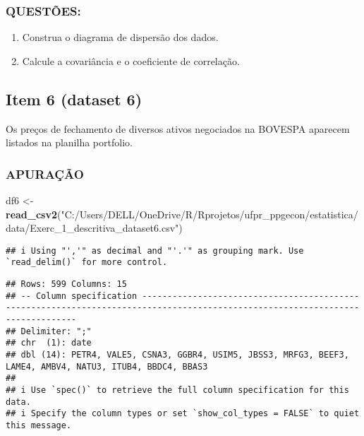 \documentclass[
]{article}
\newenvironment{Shaded}{\begin{snugshade}}{\end{snugshade}}
\newcommand{\FunctionTok}[1]{\textcolor[rgb]{0.13,0.29,0.53}{\textbf{#1}}}
\newcommand{\NormalTok}[1]{#1}
\newcommand{\OtherTok}[1]{\textcolor[rgb]{0.56,0.35,0.01}{#1}}
\newcommand{\StringTok}[1]{\textcolor[rgb]{0.31,0.60,0.02}{#1}}
\providecommand{\tightlist}{%
  \setlength{\itemsep}{0pt}\setlength{\parskip}{0pt}}
\begin{document}
\hypertarget{questuxf5es-4}{%
\subsubsection{QUESTÕES:}\label{questuxf5es-4}}

\begin{enumerate}
\def\labelenumi{\alph{enumi})}
\tightlist
\item
  Construa o diagrama de dispersão dos dados.\\
\item
  Calcule a covariância e o coeficiente de correlação.
\end{enumerate}

\hypertarget{item-6-dataset-6}{%
\subsection{Item 6 (dataset 6)}\label{item-6-dataset-6}}

Os preços de fechamento de diversos ativos negociados na BOVESPA
aparecem listados na planilha portfolio.

\hypertarget{apurauxe7uxe3o-5}{%
\subsubsection{APURAÇÃO}\label{apurauxe7uxe3o-5}}

\begin{Shaded}
\begin{Highlighting}[]
\NormalTok{df6 }\OtherTok{\textless{}{-}} \FunctionTok{read\_csv2}\NormalTok{(}\StringTok{"C:/Users/DELL/OneDrive/R/Rprojetos/ufpr\_ppgecon/estatistica/data/Exerc\_1\_descritiva\_dataset6.csv"}\NormalTok{)}
\end{Highlighting}
\end{Shaded}

\begin{verbatim}
## i Using "','" as decimal and "'.'" as grouping mark. Use `read_delim()` for more control.
\end{verbatim}

\begin{verbatim}
## Rows: 599 Columns: 15
## -- Column specification -------------------------------------------------------------------------------------------------------------------------------
## Delimiter: ";"
## chr  (1): date
## dbl (14): PETR4, VALE5, CSNA3, GGBR4, USIM5, JBSS3, MRFG3, BEEF3, LAME4, AMBV4, NATU3, ITUB4, BBDC4, BBAS3
## 
## i Use `spec()` to retrieve the full column specification for this data.
## i Specify the column types or set `show_col_types = FALSE` to quiet this message.
\end{verbatim}
\end{document}
